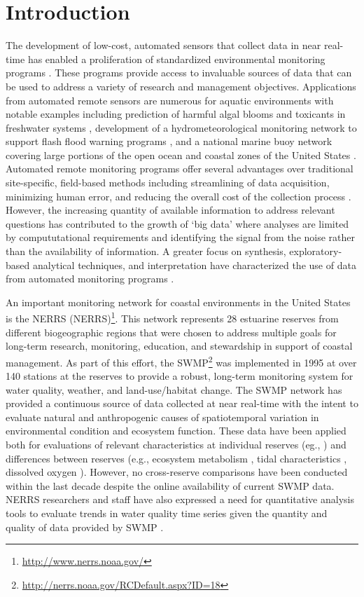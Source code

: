 \documentclass[10pt,letterpaper]{article}\usepackage[]{graphicx}\usepackage[]{color}
\begin{document}
\linenumbers

\section*{Introduction}

The development of low-cost, automated sensors that collect data in near real-time has enabled a proliferation of standardized environmental monitoring programs \cite{Glasgow04,Fries08}.  These programs provide access to invaluable sources of data that can be used to address a variety of research and management objectives.  Applications from automated remote sensors are numerous for aquatic environments with notable examples including prediction of harmful algal blooms and toxicants in freshwater systems \cite{Reed10}, development of a hydrometeorological monitoring network to support flash flood warning programs \cite{HADS15}, and a national marine buoy network covering large portions of the open ocean and coastal zones of the United States \cite{NDBC15}.  Automated remote monitoring programs offer several advantages over traditional site-specific, field-based methods including streamlining of data acquisition, minimizing human error, and reducing the overall cost of the collection process \cite{Glasgow04}.  However, the increasing quantity of available information to address relevant questions has contributed to the growth of `big data' where analyses are limited by compututational requirements and identifying the signal from the noise rather than the availability of information. A greater focus on synthesis, exploratory-based analytical techniques, and interpretation have characterized the use of data from automated monitoring programs \cite{Campbell13,Millie13}.

An important monitoring network for coastal environments in the United States is the \acl{NERRS} (\acs{NERRS})\footnote{\url{http://www.nerrs.noaa.gov/}}.  This network represents 28 estuarine reserves from different biogeographic regions that were chosen to address multiple goals for long-term research, monitoring, education, and stewardship in support of coastal management.  As part of this effort, the \acf{SWMP}\footnote{\url{http://nerrs.noaa.gov/RCDefault.aspx?ID=18}} was implemented in 1995 at over 140 stations at the reserves to provide a robust, long-term monitoring system for water quality, weather, and land-use/habitat change.  The \ac{SWMP} network has provided a continuous source of data collected at near real-time with the intent to evaluate natural and anthropogenic causes of spatiotemporal variation in environmental condition and ecosystem function.  These data have been applied both for evaluations of relevant characteristics at individual reserves (eg., \cite{Bulthius95,Dix08}) and differences between reserves (e.g., ecosystem metabolism \cite{Caffrey03,Caffrey04}, tidal characteristics \cite{Sanger02}, dissolved oxygen \cite{Wenner04}).  However, no cross-reserve comparisons have been conducted within the last decade despite the online availability of current \ac{SWMP} data.  \ac{NERRS} researchers and staff have also expressed a need for quantitative analysis tools to evaluate trends in water quality time series given the quantity and quality of data provided by \ac{SWMP} \cite{SWMP14}.          
\end{document}
